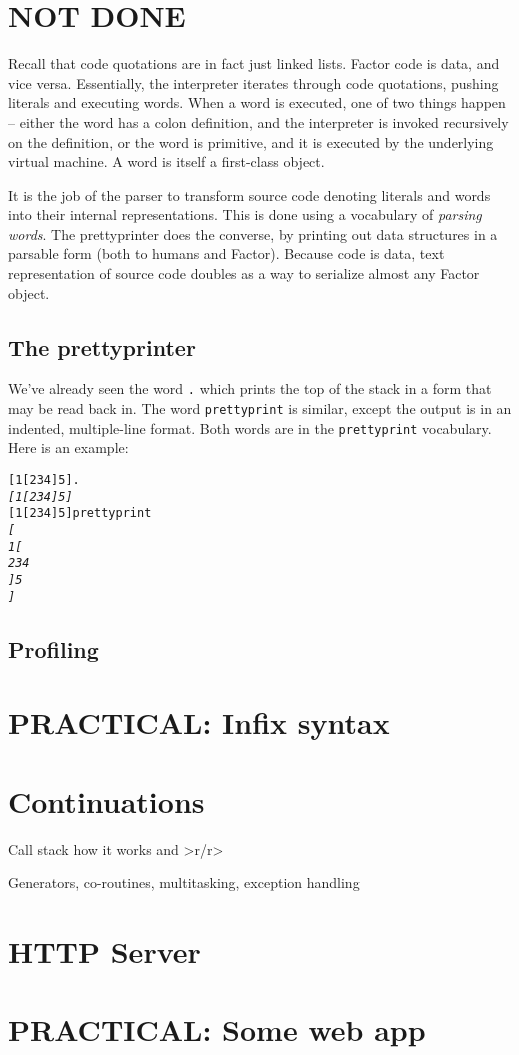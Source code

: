 \documentclass[english]{article}
\begin{document}
\section{NOT DONE}

Recall that code quotations are in fact just linked lists. Factor code is data, and vice versa. Essentially, the interpreter iterates through code quotations, pushing literals and executing words. When a word is executed, one of two things happen -- either the word has a colon definition, and the interpreter is invoked recursively on the definition, or the word is primitive, and it is executed by the underlying virtual machine. A word is itself a first-class object.

It is the job of the parser to transform source code denoting literals and words into their internal representations. This is done using a vocabulary of \emph{parsing words}. The prettyprinter does the converse, by printing out data structures in a parsable form (both to humans and Factor). Because code is data, text representation of source code doubles as a way to serialize almost any Factor object.

\subsection{The prettyprinter}

We've already seen the word \texttt{.} which prints the top of the stack in a form that may be read back in. The word \texttt{prettyprint} is similar, except the output is in an indented, multiple-line format. Both words are in the \texttt{prettyprint} vocabulary. Here is an example:

\begin{alltt}
{[} 1 {[} 2 3 4 {]} 5 {]} .
\emph{{[} 1 {[} 2 3 4 {]} 5 {]}}
{[} 1 {[} 2 3 4 {]} 5 {]} prettyprint
\emph{{[}
    1 {[}
        2 3 4
    {]} 5
{]}}
\end{alltt}


\subsection{Profiling}

\section{PRACTICAL: Infix syntax}


\section{Continuations}

Call stack how it works and >r/r>

Generators, co-routines, multitasking, exception handling


\section{HTTP Server}


\section{PRACTICAL: Some web app}
\end{document}
